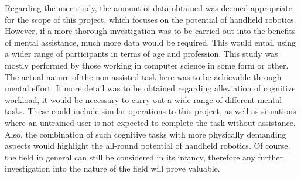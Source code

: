 \documentclass[11pt]{article}
\begin{document}
Regarding the user study, the amount of data obtained was deemed appropriate for the scope of this project, which focuses on the potential of handheld robotics. However, if a more thorough investigation was to be carried out into the benefits of mental assistance, much more data would be required. This would entail using a wider range of participants in terms of age and profession. This study was mostly performed by those working in computer science in some form or other. The actual nature of the non-assisted task here was to be achievable through mental effort. If more detail was to be obtained regarding alleviation of cognitive workload, it would be necessary to carry out a wide range of different mental tasks. These could include similar operations to this project, as well as situations where an untrained user is not expected to complete the task without assistance. Also, the combination of such cognitive tasks with more physically demanding aspects would highlight the all-round potential of handheld robotics. Of course, the field in general can still be considered in its infancy, therefore any further investigation into the nature of the field will prove valuable.

\pagebreak



\pagebreak
\pagestyle{roman}
\end{document}

